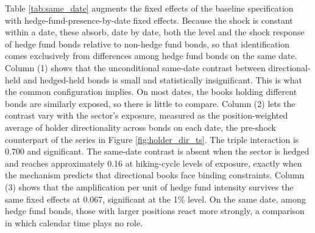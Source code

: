 \documentclass[english, 11pt, oneside]{article}
\begin{document}
Table \ref{tab:same_date} augments the fixed effects of the baseline specification with hedge-fund-presence-by-date fixed effects. Because the shock is constant within a date, these absorb, date by date, both the level and the shock response of hedge fund bonds relative to non-hedge fund bonds, so that identification comes exclusively from differences among hedge fund bonds on the same date. Column (1) shows that the unconditional same-date contrast between directional-held and hedged-held bonds is small and statistically insignificant. This is what the common configuration implies. On most dates, the books holding different bonds are similarly exposed, so there is little to compare. Column (2) lets the contrast vary with the sector's exposure, measured as the position-weighted average of holder directionality across bonds on each date, the pre-shock counterpart of the series in Figure \ref{fig:holder_dir_ts}. The triple interaction is 0.700 and significant. The same-date contrast is absent when the sector is hedged and reaches approximately 0.16 at hiking-cycle levels of exposure, exactly when the mechanism predicts that directional books face binding constraints. Column (3) shows that the amplification per unit of hedge fund intensity survives the same fixed effects at 0.067, significant at the 1\% level. On the same date, among hedge fund bonds, those with larger positions react more strongly, a comparison in which calendar time plays no role. \\
\end{document}
